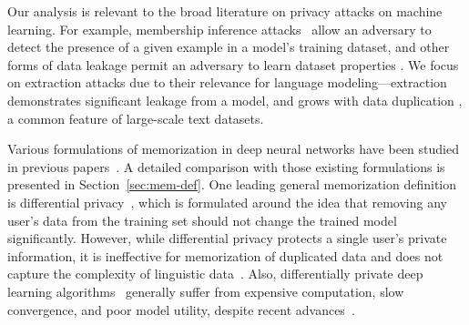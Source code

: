 Our analysis is relevant to the broad literature on privacy attacks on machine learning.
For example, membership inference attacks~\citep{shokri2017membership, yeom2018privacy} allow an adversary to detect the presence of a given example in a model's training dataset, and other forms of data leakage permit an adversary to learn dataset properties \citep{ganju2018property,fredrikson2015model}.
We focus on extraction attacks due to their relevance for language modeling---extraction demonstrates significant leakage from a model, and grows with data duplication \citep{lee2021deduplicating}, a common feature of large-scale text datasets.


Various formulations of memorization in deep neural networks have been studied in previous papers~\citep{carlini2019secret,carlini2020extracting,feldman2020neural,zhang2021counterfactual,colinpaper}. A detailed comparison with those existing formulations is presented in Section~\ref{sec:mem-def}.
One leading general memorization definition is differential privacy~\citep{dwork2006calibrating}, which is formulated around the idea that removing any user's data from the training set should not change the trained model significantly.
However, while differential privacy protects a single user's private information, it is ineffective for memorization of duplicated data and does not capture the complexity of linguistic data~\citep{brown2022does}.
Also, differentially private deep learning algorithms~\citep{abadi2016deep} generally suffer from expensive computation, slow convergence, and poor model utility, despite recent advances~\citep{anil2021large}.


